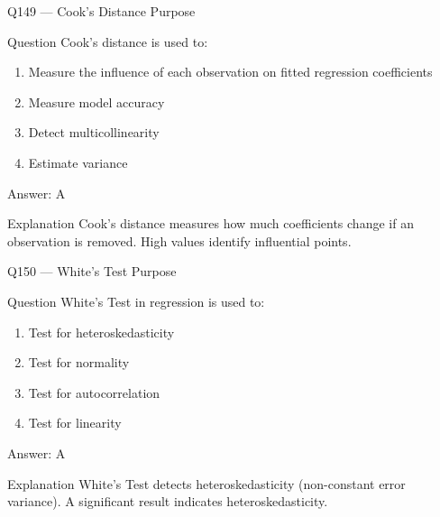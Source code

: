 \documentclass[aspectratio=169,8pt]{beamer}
\begin{document}
	\begin{frame}{Q149 --- Cook's Distance Purpose}
		\begin{block}{Question}
			Cook's distance is used to:
			\begin{enumerate}
				\item Measure the influence of each observation on fitted regression coefficients
				\item Measure model accuracy
				\item Detect multicollinearity
				\item Estimate variance
			\end{enumerate}
		\end{block}
		\begin{exampleblock}{Answer: A}\end{exampleblock}
		\begin{block}{Explanation}
			Cook's distance measures how much coefficients change if an observation is removed. High values identify influential points.
		\end{block}
	\end{frame}
	
	\begin{frame}{Q150 --- White's Test Purpose}
		\begin{block}{Question}
			White's Test in regression is used to:
			\begin{enumerate}
				\item Test for heteroskedasticity
				\item Test for normality
				\item Test for autocorrelation
				\item Test for linearity
			\end{enumerate}
		\end{block}
		\begin{exampleblock}{Answer: A}\end{exampleblock}
		\begin{block}{Explanation}
			White's Test detects heteroskedasticity (non-constant error variance). A significant result indicates heteroskedasticity.
		\end{block}
	\end{frame}
	
\end{document}
